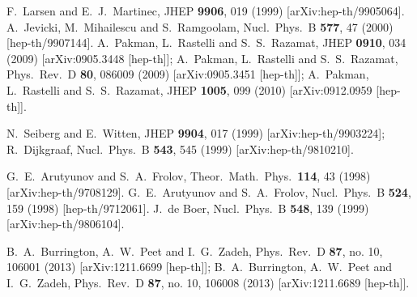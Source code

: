 \documentclass[11pt]{article}
\begin{document}
\begin{thebibliography}{99}
  
  F.~Larsen and E.~J.~Martinec,
  JHEP {\bf 9906}, 019 (1999)
  [arXiv:hep-th/9905064].
  A.~Jevicki, M.~Mihailescu and S.~Ramgoolam,
  Nucl.\ Phys.\ B {\bf 577}, 47 (2000)
  [hep-th/9907144].  
  A.~Pakman, L.~Rastelli and S.~S.~Razamat,
  JHEP {\bf 0910}, 034 (2009)
  [arXiv:0905.3448 [hep-th]]; 
  A.~Pakman, L.~Rastelli and S.~S.~Razamat,
  Phys.\ Rev.\ D {\bf 80}, 086009 (2009)
  [arXiv:0905.3451 [hep-th]];
     A.~Pakman, L.~Rastelli and S.~S.~Razamat,
  JHEP {\bf 1005}, 099 (2010)
  [arXiv:0912.0959 [hep-th]]. 
  
  
N.~Seiberg and E.~Witten,
  JHEP {\bf 9904}, 017 (1999)
  [arXiv:hep-th/9903224];
R.~Dijkgraaf,
  Nucl.\ Phys.\  B {\bf 543}, 545 (1999)
  [arXiv:hep-th/9810210].
  
  
  G.~E.~Arutyunov and S.~A.~Frolov,
  Theor.\ Math.\ Phys.\  {\bf 114}, 43 (1998)
  [arXiv:hep-th/9708129].
  G.~E.~Arutyunov and S.~A.~Frolov,
  Nucl.\ Phys.\ B {\bf 524}, 159 (1998)
  [hep-th/9712061].
  J.~de Boer,
  Nucl.\ Phys.\ B {\bf 548}, 139 (1999)
  [arXiv:hep-th/9806104].
  
  B.~A.~Burrington, A.~W.~Peet and I.~G.~Zadeh,
  Phys.\ Rev.\ D {\bf 87}, no. 10, 106001 (2013)
  [arXiv:1211.6699 [hep-th]]; 
  B.~A.~Burrington, A.~W.~Peet and I.~G.~Zadeh,
  Phys.\ Rev.\ D {\bf 87}, no. 10, 106008 (2013)
  [arXiv:1211.6689 [hep-th]].
  

\end{thebibliography}
\end{document}

